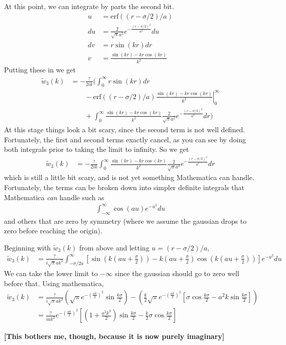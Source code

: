 \documentclass[letterpaper,twocolumn,amsmath,amssymb,prb]{revtex4-1}
\newcommand{\red}[1]{{\bf \color{red} #1}}
\newcommand{\fixme}[1]{\red{[#1]}}
\begin{document}
At this point, we can integrate by parts the second bit.
\begin{align}
  u &= \mathrm{erf}((r-\sigma/2)/a) \\
  du &= \frac{2}{\sqrt{\pi}a^2} e^{-\frac{(r-\sigma/2)^2}{a^2}} du \\
  dv &= r \sin(kr) dr \\
  v &= \frac{\sin(kr) - kr \cos(kr)}{k^2}
\end{align}
Putting these in we get
\begin{align}
  \tilde{w}_3(k)
  &=  -\frac{?}{2ik} \Big(
  \int_0^\infty r \sin(kr) dr\\ &\quad\quad
  -
  \left.\mathrm{erf}((r-\sigma/2)/a)\frac{\sin(kr) - kr
    \cos(kr)}{k^2}\right|_0^\infty\\ &\quad\quad
  +
  \int_0^\infty \frac{\sin(kr) - kr \cos(kr)}{k^2}\frac{2}{\sqrt{\pi}a^2} e^{-\frac{(r-\sigma/2)^2}{a^2}} dr
  \Big)
\end{align}
At this stage things look a bit scary, since the second term is not
well defined.  Fortunately, the first and second terms exactly cancel,
as you can see by doing both integrals prior to taking the limit to
infinity.  So we get
\begin{align}
  \tilde{w}_3(k)
  &=  -\frac{?}{2ik}\int_0^\infty \frac{\sin(kr) - kr
    \cos(kr)}{k^2}\frac{2}{\sqrt{\pi}a^2}
  e^{-\frac{(r-\sigma/2)^2}{a^2}} dr
\end{align}
which is still a little bit scary, and is not yet something
Mathematica can handle.  Fortunately, the terms can be broken down
into simpler definite integrals that Mathematica \emph{can} handle
such as
\begin{align}
  \int_{-\infty}^\infty \cos(a u)e^{-u^2}du
\end{align}
and others that are zero by symmetry (where we assume the gaussian
drops to zero before reaching the origin).
\begin{widetext}
Beginning with $\tilde{w}_3(k)$ from above and letting $u = (r-\sigma/2)/a,$
  \begin{align}
    \tilde{w}_3(k)
    &=  \frac{?}{i\sqrt{\pi}ak^3}\int_{-\sigma/2a}^\infty \left[ \sin(k(au+\frac{\sigma}{2}))
      - k(au + \frac{\sigma}{2}) \cos(k(au+\frac{\sigma}{2}))\right] e^{-u^2} du
  \end{align}
We can take the lower limit to $-\infty$ since the gaussian should go
to zero well before that. Using mathematica,
  \begin{align}
    \tilde{w}_3(k) &= \frac{?}{i\sqrt{\pi}ak^3}
    \left(\sqrt{\pi}e^{-\left(\frac{ak}{2}\right)^2}
    \sin{\frac{k\sigma}{2}} \right) - \left( \frac{k}{2}
    \sqrt{\pi}e^{-\left(\frac{ak}{2}\right)^2} \left[\sigma
      \cos{\frac{k \sigma}{2}} - a^2 k \sin{\frac{k \sigma}{2}}
      \right] \right) \\ &=
    \frac{?}{iak^3}e^{-\left(\frac{ak}{2}\right)^2}\left[ \left(1 + \frac{a^2k^3}{2} \right)  
      \sin{\frac{k\sigma}{2}} - \frac{k}{2} \sigma\cos{\frac{k \sigma}{2}}  \right]
  \end{align}
\end{widetext}
\fixme{This bothers me, though, because it is now purely imaginary}
\end{document}

